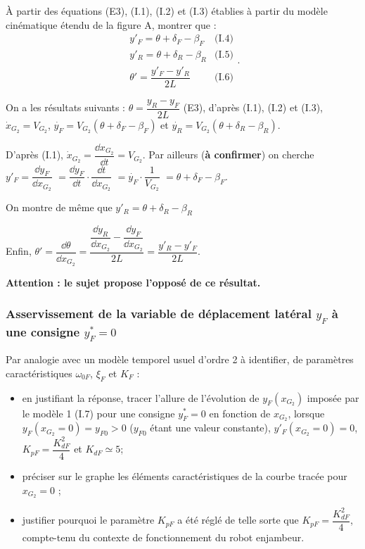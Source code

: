 \documentclass[11pt]{article}
\begin{document}


\UPSTIquestion À partir des équations (E3), (I.1), (I.2) et (I.3) établies à partir du modèle cinématique étendu de la
figure A, montrer que : 
$$ \begin{array}{lr}
y'_F = \theta + \delta_F-\beta_F   & \text{(I.4)} \\
y'_R = \theta + \delta_R-\beta_R  & \text{(I.5)}\\
\theta'=\dfrac{y'_F-y'_R}{2L}       & \text{(I.6)}
\end{array}.$$

\begin{UPSTIcorrige}


On a les résultats suivants :  $  \theta = \dfrac{ y_{R} - y_F}{2L }$ (E3), d'après  (I.1), (I.2) et (I.3), $\dot{x}_{G_2}=V_{G_2}$, $\dot{y_F}=V_{G_2}\left(\theta + \delta_F - \beta_F\right)$ et  $\dot{y_R}=V_{G_2}\left(\theta + \delta_R - \beta_R\right)$. 


D'après (I.1), $\dot{x}_{G_2}= \dfrac{\dd x_{G_2}}{\dd t} =  V_{G_2}$.
Par ailleurs (\textbf{à confirmer}) on cherche $y'_F=\dfrac{\dd y_F}{\dd x_{G_2}} $ 
$= \dfrac{\dd y_F}{\dd t}  \cdot \dfrac{\dd  t}{\dd x_{G_2}}$ 
$ =\dot{y_F}\cdot \dfrac{1}{V_{G_2}}$ 
$ =\theta + \delta_F - \beta_F$.

On montre de même que $y'_R = \theta + \delta_R-\beta_R$

Enfin, $\theta' = \dfrac{\dd \theta}{\dd x_{G_2}}=\dfrac{ \dfrac{\dd y_{R}}{\dd x_{G_2}} - \dfrac{\dd y_F}{\dd x_{G_2}}}{2L } = \dfrac{y'_R-y'_F}{2L}$.

\textbf{Attention : le sujet propose l'opposé de ce résultat.}

\end{UPSTIcorrige}

\subsubsection{Asservissement de la variable de déplacement latéral $y_F$ à une consigne $y^*_F=0$}


\UPSTIquestion Par analogie avec un modèle temporel usuel d’ordre 2 à identifier, de paramètres caractéristiques $\omega_{0F}$, $\xi_F$ et $K_F$ :
\begin{itemize}
\item en justifiant la réponse, tracer l’allure de l’évolution de  $y_F\left(x_{G_2}\right)$  imposée par le modèle 1 (I.7) pour une consigne $y_F^*=0$ en fonction de $x_{G_2}$, lorsque $y_F\left(x_{G_2}=0\right)=y_{F0}>0$
 ($y_{F0}$ étant une valeur constante), $y'_F\left(x_{G_2}=0\right)=0$, $K_{pF}=\dfrac{K^2_{dF}}{4}$ et $K_{dF}\simeq 5$; 
 \item préciser sur le graphe les éléments caractéristiques de la courbe tracée pour $x_{G_2}=0$ ;
\item justifier pourquoi le paramètre $K_{pF}$ a été réglé de telle sorte que $K_{pF}=\dfrac{K^2_{dF}}{4}$, compte-tenu du contexte de fonctionnement du robot enjambeur.
\end{itemize}
\end{document}
